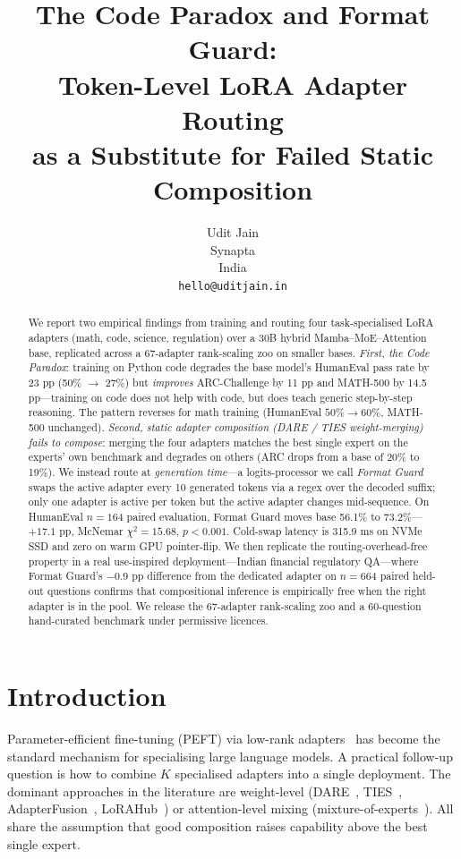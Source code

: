 \documentclass{article}
\title{The Code Paradox and Format Guard:\\Token-Level LoRA Adapter Routing\\as a Substitute for Failed Static Composition}
\author{%
  Udit Jain \\
  Synapta\\
  India \\
  \texttt{hello@uditjain.in} \\
}
\begin{document}
\maketitle

\begin{abstract}
We report two empirical findings from training and routing four task-specialised LoRA adapters (math, code, science, regulation) over a 30B hybrid Mamba--MoE--Attention base, replicated across a 67-adapter rank-scaling zoo on smaller bases. \emph{First, the Code Paradox}: training on Python code degrades the base model's HumanEval pass rate by 23 pp (50\% $\rightarrow$ 27\%) but \emph{improves} ARC-Challenge by 11 pp and MATH-500 by 14.5 pp---training on code does not help with code, but does teach generic step-by-step reasoning. The pattern reverses for math training (HumanEval $50\% \rightarrow 60\%$, MATH-500 unchanged). \emph{Second, static adapter composition (DARE / TIES weight-merging) fails to compose}: merging the four adapters matches the best single expert on the experts' own benchmark and degrades on others (ARC drops from a base of 20\% to 19\%). We instead route at \emph{generation time}---a logits-processor we call \emph{Format Guard} swaps the active adapter every 10 generated tokens via a regex over the decoded suffix; only one adapter is active per token but the active adapter changes mid-sequence. On HumanEval $n=164$ paired evaluation, Format Guard moves base 56.1\% to 73.2\%---$+17.1$ pp, McNemar $\chi^2 = 15.68$, $p < 0.001$. Cold-swap latency is 315.9 ms on NVMe SSD and zero on warm GPU pointer-flip. We then replicate the routing-overhead-free property in a real use-inspired deployment---Indian financial regulatory QA---where Format Guard's $-0.9$ pp difference from the dedicated adapter on $n=664$ paired held-out questions confirms that compositional inference is empirically free when the right adapter is in the pool. We release the 67-adapter rank-scaling zoo and a 60-question hand-curated benchmark under permissive licences.
\end{abstract}


\section{Introduction}
\label{sec:intro}

Parameter-efficient fine-tuning (PEFT) via low-rank adapters~\citep{hu2022lora} has become the standard mechanism for specialising large language models. A practical follow-up question is how to combine $K$ specialised adapters into a single deployment. The dominant approaches in the literature are weight-level (DARE~\citep{yu2024dare}, TIES~\citep{yadav2023ties}, AdapterFusion~\citep{pfeiffer2021adapterfusion}, LoRAHub~\citep{huang2023lorahub}) or attention-level mixing (mixture-of-experts~\citep{shazeer2017moe, fedus2022switch}). All share the assumption that good composition raises capability above the best single expert.
\end{document}
